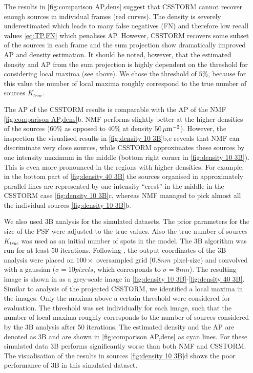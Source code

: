 The results in \autoref{fig:comparison AP,dens} suggest that CSSTORM cannot recover enough sources in individual frames (red curves). The density is severely underestimated which leads to many false negatives (FN) and therefore low recall values \autoref{eq:TP,FN} which penalises AP. However, CSSTORM recovers some subset of the sources in each frame and the sum projection show dramatically improved AP and density estimation. It should be noted, however, that the estimated density and AP from the sum projection is highly dependent on the threshold for considering local maxima (see above). We chose the threshold of $5\%$, because for this value the number of local maxima roughly correspond to the true number of sources $K_{true}$.

The AP of the CSSTORM results is comparable with the AP of the NMF \autoref{fig:comparison AP,dens}b. NMF performs slightly better at the higher densities of the sources (60\% as opposed to 40\% at density $50\, \mathrm{\mu m}^{-2}$). However, the inspection the visualised results in \autoref{fig:density 10 3B}b,c reveals that NMF can discriminate very close sources, while CSSTORM approximates these sources by one intensity maximum in the middle (bottom right corner in \autoref{fig:density 10 3B}). This is even more pronounced in the regions with higher densities. For example, in the bottom part of \autoref{fig:density 40 3B} the sources organised in approximately parallel lines are represented by one intensity ``crest'' in the middle in the CSSTORM case \autoref{fig:density 10 3B}c, whereas NMF managed to pick almost all the individual sources \autoref{fig:density 10 3B}b. 

We also used 3B analysis for the simulated datasets. The prior parameters for the size of the PSF were adjusted to the true values. Also the true number of sources $K_{true}$ was used as an initial number of spots in the model. The 3B algorithm was run for at least 50 iterations. Following \cite{Cox2011}, the output coordinates of the 3B analysis were placed on $100\times$ oversampled grid ($0.8\unit{nm}$ pixel-size) and convolved with a gaussian ($\sigma=10\unit{pixels}$, which corresponds to $\sigma=8\unit{nm}$). The resulting image is shown in as a grey-scale image in \autoref{fig:density 10 3B}-\ref{fig:density 40 3B}. Similar to analysis of the projected CSSTORM, we identified a local maxima in the images. Only the maxima above a certain threshold were considered for evaluation. The threshold was set individually for each image, such that the number of local maxima roughly corresponds to the number of sources considered by the 3B analysis after 50 iterations. The estimated density and the AP are denoted as \textsf{3B} and are shown in \autoref{fig:comparison AP,dens} as cyan lines. For these simulated data 3B performs significantly worse than both NMF and CSSTORM. The visualisation of the results in sources \autoref{fig:density 10 3B}d shows the poor performance of 3B in this simulated dataset.

